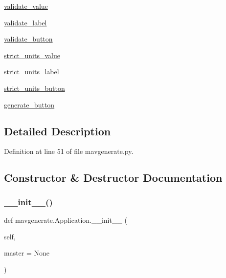 \begin{DoxyCompactItemize}
\item 
\mbox{\hyperlink{classmavgenerate_1_1Application_a06f96dccc9bc41156675a85413d71f02}{validate\+\_\+value}}
\item 
\mbox{\hyperlink{classmavgenerate_1_1Application_a51a11015b2e11a6846b03e331b1d751b}{validate\+\_\+label}}
\item 
\mbox{\hyperlink{classmavgenerate_1_1Application_a55227b621af06b0760c80e0987b6fed8}{validate\+\_\+button}}
\item 
\mbox{\hyperlink{classmavgenerate_1_1Application_af7bff81d7094432b40cbd588e0d2daa5}{strict\+\_\+units\+\_\+value}}
\item 
\mbox{\hyperlink{classmavgenerate_1_1Application_a6f6fbbc184db2ee81653857b5bffbad5}{strict\+\_\+units\+\_\+label}}
\item 
\mbox{\hyperlink{classmavgenerate_1_1Application_ae6b0c8bf3c010ef0bc440bb675e891dc}{strict\+\_\+units\+\_\+button}}
\item 
\mbox{\hyperlink{classmavgenerate_1_1Application_a14066b479ea2e2a37d3864af10149410}{generate\+\_\+button}}
\end{DoxyCompactItemize}


\subsection{Detailed Description}


Definition at line 51 of file mavgenerate.\+py.



\subsection{Constructor \& Destructor Documentation}
\mbox{\label{classmavgenerate_1_1Application_a102f9945e9b6e87946ac389c83c54bc1}} 
\subsubsection{\texorpdfstring{\_\_init\_\_()}{\_\_init\_\_()}}
{\footnotesize\ttfamily def mavgenerate.\+Application.\+\_\+\+\_\+init\+\_\+\+\_\+ (\begin{DoxyParamCaption}\item[{}]{self,  }\item[{}]{master = {\ttfamily None} }\end{DoxyParamCaption})}



